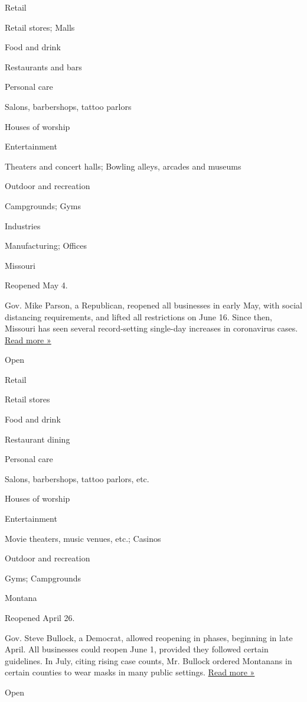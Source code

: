 Retail

Retail stores; Malls

Food and drink

Restaurants and bars

Personal care

Salons, barbershops, tattoo parlors

Houses of worship

Entertainment

Theaters and concert halls; Bowling alleys, arcades and museums

Outdoor and recreation

Campgrounds; Gyms

Industries

Manufacturing; Offices

Missouri

Reopened May 4.

Gov. Mike Parson, a Republican, reopened all businesses in early May,
with social distancing requirements, and lifted all restrictions on June
16. Since then, Missouri has seen several record-setting single-day
increases in coronavirus cases.
\href{https://abcnews.go.com/US/missouri-health-officials-call-aggressive-actions-covid-19/story?id=71998723}{Read
more »}

Open

Retail

Retail stores

Food and drink

Restaurant dining

Personal care

Salons, barbershops, tattoo parlors, etc.

Houses of worship

Entertainment

Movie theaters, music venues, etc.; Casinos

Outdoor and recreation

Gyms; Campgrounds

Montana

Reopened April 26.

Gov. Steve Bullock, a Democrat, allowed reopening in phases, beginning
in late April. All businesses could reopen June 1, provided they
followed certain guidelines. In July, citing rising case counts, Mr.
Bullock ordered Montanans in certain counties to wear masks in many
public settings.
\href{https://montanafreepress.org/2020/07/15/bullock-covid-masks-mandatory/}{Read
more »}

Open

